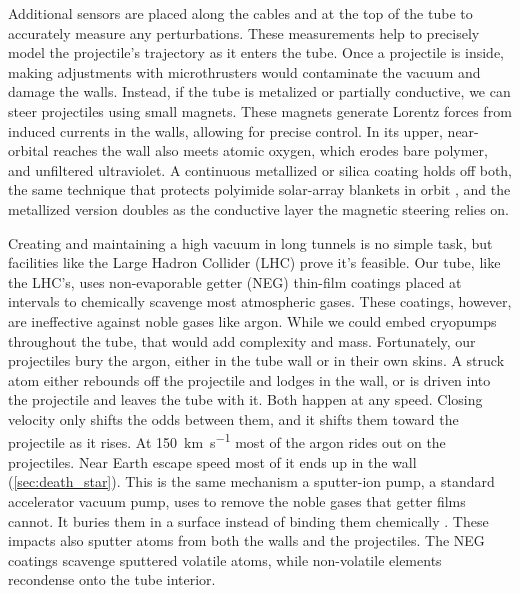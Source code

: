 \documentclass{article}
\begin{document}
Additional sensors are placed along the cables and at the top of the tube to accurately measure any perturbations. These measurements help to precisely model the projectile's trajectory as it enters the tube. Once a projectile is inside, making adjustments with microthrusters would contaminate the vacuum and damage the walls. Instead, if the tube is metalized or partially conductive, we can steer projectiles using small magnets. These magnets generate Lorentz forces from induced currents in the walls, allowing for precise control. In its upper, near-orbital reaches the wall also meets atomic oxygen, which erodes bare polymer, and unfiltered ultraviolet. A continuous metallized or silica coating holds off both, the same technique that protects polyimide solar-array blankets in orbit \cite{ao_protection_banks}, and the metallized version doubles as the conductive layer the magnetic steering relies on.

Creating and maintaining a high vacuum in long tunnels is no simple task, but facilities like the Large Hadron Collider (LHC) prove it's feasible. Our tube, like the LHC's, uses non-evaporable getter (NEG) \cite{neg_coatings} thin-film coatings placed at intervals to chemically scavenge most atmospheric gases. These coatings, however, are ineffective against noble gases like argon. While we could embed cryopumps throughout the tube, that would add complexity and mass. Fortunately, our projectiles bury the argon, either in the tube wall or in their own skins.  A struck atom either rebounds off the projectile and lodges in the wall, or is driven into the projectile and leaves the tube with it.  Both happen at any speed.  Closing velocity only shifts the odds between them, and it shifts them toward the projectile as it rises.  At \SI{150}{\kilo\meter\per\second} most of the argon rides out on the projectiles.  Near Earth escape speed most of it ends up in the wall (\autoref{sec:death_star}).  This is the same mechanism a sputter-ion pump, a standard accelerator vacuum pump, uses to remove the noble gases that getter films cannot.  It buries them in a surface instead of binding them chemically \cite{schulz1999sputterion}.  These impacts also sputter atoms from both the walls and the projectiles. The NEG coatings scavenge sputtered volatile atoms, while non-volatile elements recondense onto the tube interior.
\end{document}
